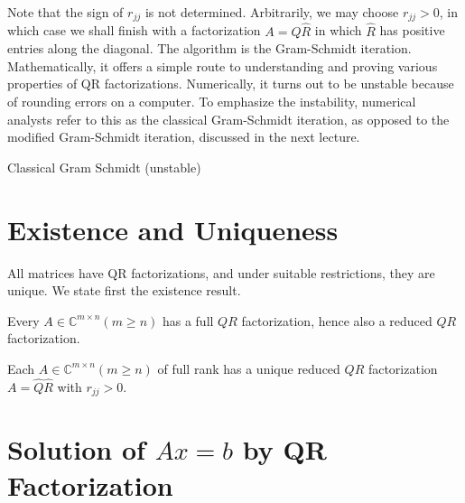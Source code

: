Note that the sign of $r_{j j}$ is not determined. Arbitrarily, we may choose $r_{j j}>0$, in which case we shall finish with a factorization $A=\hat{Q} \hat{R}$ in which $\hat{R}$ has positive entries along the diagonal. The algorithm is the Gram-Schmidt iteration. Mathematically, it offers a simple route to understanding and proving various properties of QR factorizations. Numerically, it turns out to be unstable because of rounding errors on a computer. To emphasize the instability, numerical analysts refer to this as the classical Gram-Schmidt iteration, as opposed to the modified Gram-Schmidt iteration, discussed in the next lecture.

\begin{algorithm}[H]
    \caption{Classical Gram Schmidt (unstable)}
    \label{Algo 7.1}
\end{algorithm}

\section{Existence and Uniqueness} 
All matrices have QR factorizations, and under suitable restrictions, they are unique. We state first the existence result.


\begin{theorem}
\label{thm: Existence of QR}
Every $A \in \mathbb{C}^{m \times n}(m \geq n)$ has a full $Q R$ factorization, hence also a reduced $Q R$ factorization.
\end{theorem}


\begin{theorem}
\label{thm: uniqueness of QR}
Each $A \in \mathbb{C}^{m \times n}(m \geq n)$ of full rank has a unique reduced $Q R$ factorization $A=\hat{Q} \hat{R}$ with $r_{j j}>0$.
\end{theorem}

\section{Solution of $Ax=b$ by QR Factorization} 

